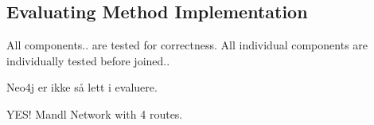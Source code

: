 \subsection{Evaluating Method Implementation}

All components.. are tested for correctness. All individual components are individually tested before joined..


Neo4j er ikke så lett i evaluere.


YES! Mandl Network with 4 routes.



